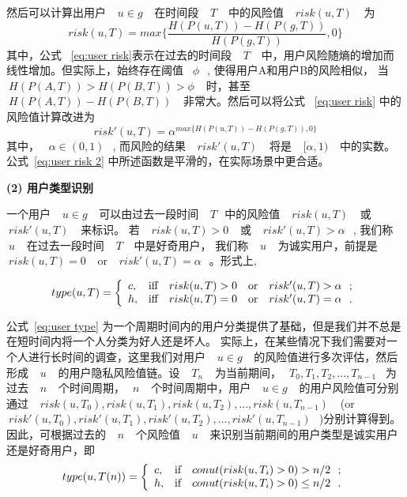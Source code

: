 然后可以计算出用户 ~$~u \in g~$~ 在时间段 ~$~T~$~ 中的风险值 ~$~risk(u,T)~$~ 为
\begin{equation}\label{eq:user risk}
risk(u,T)=max \{\frac{H(P(u,T))-H(P(g,T))}{H(P(g,T))},0\}
\end{equation}
其中，公式 ~\ref{eq:user risk}表示在过去的时间段 ~$~T~$~ 中，用户风险随熵的增加而线性增加。但实际上，始终存在阈值 ~$\phi~$~, 使得用户A和用户B的风险相似， 当 ~$~H(P(A,T))>H(P(B,T))>\phi~$~ 时，甚至 ~$~H(P(A,T))-H(P(B,T))~$~ 非常大。然后可以将公式 ~\ref{eq:user risk} 中的风险值计算改进为
\begin{equation}\label{eq:user risk 2}
risk'(u,T)=\alpha ^ {max \{H(P(u,T))-H(P(g,T)),0\}}
\end{equation}
其中， ~$\alpha \in (0,1)~$~, 而风险的结果 ~$~risk'(u,T)~$~ 将是 ~$~[\alpha, 1)~$~ 中的实数。 公式~\ref{eq:user risk 2} 中所述函数是平滑的，在实际场景中更合适。

\textbf{(2) 用户类型识别}

一个用户 ~$~u \in g~$~ 可以由过去一段时间 ~$~T~$~中的风险值 ~$~risk(u,T)~$~ 或 ~$~risk'(u,T)~$~ 来标识。 若 ~$~risk(u,T) > 0~$~ 或 ~$~risk'(u,T)>\alpha~$~, 我们称 ~$~u~$~ 在过去一段时间 ~$~T~$~ 中是好奇用户， 我们称 ~$~u~$~ 为诚实用户，前提是  ~$~risk(u,T) = 0~$~ or ~$~risk'(u,T)=\alpha~$~。形式上,

\begin{equation}\label{eq:user type}
type(u,T)=
\left\{
\begin{array}{ll}
c, & \hbox{iff ~$~risk(u,T) > 0~$~ or ~$~risk'(u,T)>\alpha~$~;} \\
h, & \hbox{iff  ~$~risk(u,T) = 0~$~ or ~$~risk'(u,T)=\alpha~$~.} \\
\end{array}
\right.
\end{equation}

公式~\ref{eq:user type} 为一个周期时间内的用户分类提供了基础，但是我们并不总是在短时间内将一个人分类为好人还是坏人。 实际上，在某些情况下我们需要对一个人进行长时间的调查，这里我们对用户 ~$~u \in g~$~ 的风险值进行多次评估，然后形成 ~$~u~$~ 的用户隐私风险值链。设 ~$~T_n~$~ 为当前期间，~$~T_0, T_1, T_2, ..., T_{n-1}$~ 为过去 ~$~n~$~ 个时间周期，~$~n~$~ 个时间周期中，用户 ~$~u \in g~$~ 的用户风险值可分别通过 ~$~risk(u,T_0),risk(u,T_1),risk(u,T_2),..., risk(u,T_{n-1})~$~ (or ~$~risk'(u,T_0), risk'(u,T_1), risk'(u,T_2), ..., risk'(u,T_{n-1})~$~)分别计算得到。因此，可根据过去的 ~$~n~$~ 个风险值 ~$~u~$~ 来识别当前期间的用户类型是诚实用户还是好奇用户，即
\begin{equation}\label{eq:user type Tn 1}
type(u,T(n))=
\left\{
\begin{array}{ll}
c, & \hbox{if ~$~conut(risk(u,T_i) > 0) > n/2~$~;} \\
h, & \hbox{if ~$~conut(risk(u,T_i) > 0) \leq n/2~$~.} \\
\end{array}
\right.
\end{equation}

